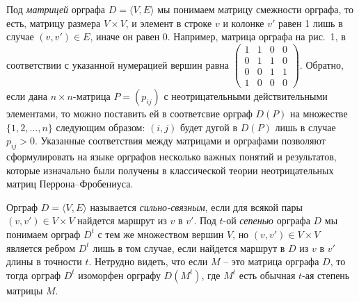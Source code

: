 \documentclass[11pt]{article}
\begin{document}
Под \emph{матрицей} орграфа $D=\langle V,E\rangle$ мы понимаем матрицу
смежности орграфа, то есть, матрицу размера $V\times V$, и элемент в строке
$v$ и колонке $v'$ равен 1 лишь в случае $(v,v')\in E$, иначе он равен 0.
Например, матрица орграфа на рис.~1, в соответствии с указанной нумерацией
вершин равна $\left(\begin{smallmatrix}1&1&0&0\\
0&1&1&0\\ 0&0&1&1\\ 1&0&0&0 \end{smallmatrix}\right)$. Обратно, если дана 
$n\times n$-матрица $P=(p_{ij})$ с неотрицательными действительными элементами, 
то можно поставить ей в соответсвие орграф $D(P)$ на множестве $\{1,2,\dots,n\}$
следующим образом: $(i,j)$ будет дугой в $D(P)$ лишь в случае $p_{ij}>0$. 
Указанные соответствия между матрицами и орграфами позволяют сформулировать на
языке орграфов несколько важных понятий и результатов, которые изначально
были получены в классической теории неотрицательных матриц Перрона--Фробениуса.



Орграф $D=\langle V,E\rangle$ называется  \emph{сильно-связным}, 
если для всякой пары $(v,v')\in V\times V$ найдется маршрут из $v$ в $v'$. 
Под $t$-ой \emph{сепенью} орграфа $D$ мы понимаем орграф $D^t$ с тем
же множеством вершин $V$, но $(v,v')\in V\times V$ является ребром $D^t$
лишь в том случае, если найдется маршрут в $D$ из $v$ в $v'$ длины в точности $t$. 
Нетрудно видеть, что если $M$ -- это матрица орграфа $D$, то тогда орграф $D^t$ 
изоморфен орграфу $D(M^t)$, где $M^t$ есть обычная $t$-ая степень матрицы $M$.
\end{document}
